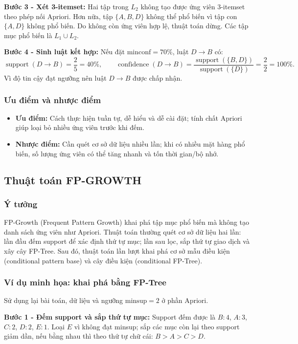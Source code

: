 \textbf{Bước 3 - Xét 3-itemset:} Hai tập trong $L_2$ không tạo được ứng viên 3-itemset theo phép nối Apriori. Hơn nữa, tập $\{A,B,D\}$ không thể phổ biến vì tập con $\{A,D\}$ không phổ biến. Do không còn ứng viên hợp lệ, thuật toán dừng. Các tập mục phổ biến là $L_1\cup L_2$.

\textbf{Bước 4 - Sinh luật kết hợp:} Nếu đặt $\text{minconf}=70\%$, luật $D\rightarrow B$ có:
\[
\operatorname{support}(D\rightarrow B)=\frac{2}{5}=40\%,\qquad
\operatorname{confidence}(D\rightarrow B)
=\frac{\operatorname{support}(\{B,D\})}{\operatorname{support}(\{D\})}
=\frac{2}{2}=100\%.
\]
Vì độ tin cậy đạt ngưỡng nên luật $D\rightarrow B$ được chấp nhận.

\subsubsection{Ưu điểm và nhược điểm}
\begin{itemize}
    \item \textbf{Ưu điểm:} Cách thực hiện tuần tự, dễ hiểu và dễ cài đặt; tính chất Apriori giúp loại bỏ nhiều ứng viên trước khi đếm.
    \item \textbf{Nhược điểm:} Cần quét cơ sở dữ liệu nhiều lần; khi có nhiều mặt hàng phổ biến, số lượng ứng viên có thể tăng nhanh và tốn thời gian/bộ nhớ.
\end{itemize}

\subsection{Thuật toán FP-GROWTH}
\subsubsection{Ý tưởng}
FP-Growth (Frequent Pattern Growth) khai phá tập mục phổ biến mà không tạo danh sách ứng viên như Apriori. Thuật toán thường quét cơ sở dữ liệu hai lần: lần đầu đếm support để xác định thứ tự mục; lần sau lọc, sắp thứ tự giao dịch và xây cây FP-Tree. Sau đó, thuật toán lần lượt khai phá cơ sở mẫu điều kiện (conditional pattern base) và cây điều kiện (conditional FP-Tree).

\subsubsection{Ví dụ minh họa: khai phá bằng FP-Tree}
Sử dụng lại bài toán, dữ liệu và ngưỡng $\text{minsup}=2$ ở phần Apriori.

\textbf{Bước 1 - Đếm support và sắp thứ tự mục:} Support đếm được là $B:4$, $A:3$, $C:2$, $D:2$, $E:1$. Loại $E$ vì không đạt minsup; sắp các mục còn lại theo support giảm dần, nếu bằng nhau thì theo thứ tự chữ cái: $B>A>C>D$.

